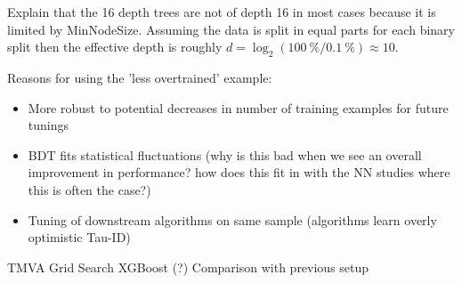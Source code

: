 Explain that the 16 depth trees are not of depth 16 in most cases because it is
limited by MinNodeSize. Assuming the data is split in equal parts for each
binary split then the effective depth is roughly
$d = \log_2(\SI{100}{\percent} / \SI{0.1}{\percent}) \approx 10$.

Reasons for using the 'less overtrained' example:
\begin{itemize}
\item More robust to potential decreases in number of training examples for
  future tunings
\item BDT fits statistical fluctuations (why is this bad when we see an overall
  improvement in performance? how does this fit in with the NN studies where
  this is often the case?)
\item Tuning of downstream algorithms on same sample (algorithms learn overly
  optimistic Tau-ID)
\end{itemize}

TMVA Grid Search
XGBoost (?)
Comparison with previous setup

